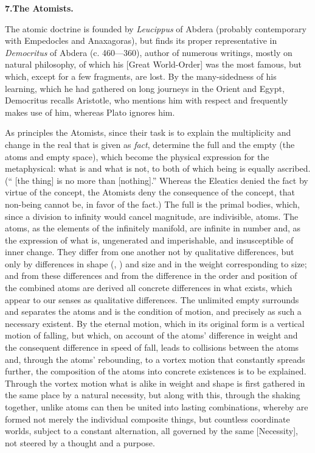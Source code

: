 \divrule

\begin{center}
\textbf{7.\enspace The Atomists.}
\end{center}

The atomic doctrine is founded by \emph{Leucippus} of Abdera (probably
contemporary with Empedocles and Anaxagoras), but finds its proper
representative in \emph{Democritus} of Abdera (c. 460---360), author of
numerous writings, mostly on natural philosophy, of which his
 [Great World-Order] was the most famous, but which,
except for a few fragments, are lost. By the many-sidedness of his
learning, which he had gathered on long journeys in the Orient and
Egypt, Democritus recalls Aristotle, who mentions him with
respect and frequently makes use of him, whereas Plato ignores him.

As principles the Atomists, since their task is to explain the
multiplicity and change in the real that is given as \emph{fact},
determine the full and the empty (the atoms and empty space), which
become the physical expression for the metaphysical: what is and what
is not, to both of which being is equally ascribed. (``
[the thing] is no more than  [nothing].'' Whereas the
Eleatics denied the fact by virtue of the concept, the Atomists deny
the consequence of the concept, that non-being cannot be, in favor of
the fact.) The full is the primal bodies, which, since a division to
infinity would cancel magnitude, are indivisible, atoms. The atoms, as
the elements of the infinitely manifold, are infinite in number and, as
the expression of what is, ungenerated and imperishable, and
insusceptible of inner change. They differ from one another not by
qualitative differences, but only by differences in shape (,
) and size and in the weight corresponding to size; and from
these differences and from the difference in the order and position of
the combined atoms are derived all concrete differences in what exists,
which appear to our senses as qualitative differences. The unlimited
empty surrounds and separates the atoms and is the condition of motion,
and precisely as such a necessary existent. By the eternal motion,
which in its original form is a vertical motion of falling, but which,
on account of the atoms' difference in weight and the consequent
difference in speed of fall, leads to collisions between the atoms and,
through the atoms' rebounding, to a vortex motion that constantly
spreads further, the composition of the atoms into concrete existences
is to be explained. Through the vortex motion what is alike in weight
and shape is first gathered in the same place by a natural necessity,
but along with this, through the shaking together, unlike atoms can
then be united into lasting combinations, whereby are formed not merely
the individual composite things, but countless coordinate worlds,
subject to a constant alternation, all governed by the same
 [Necessity], not steered by a thought and a purpose.

